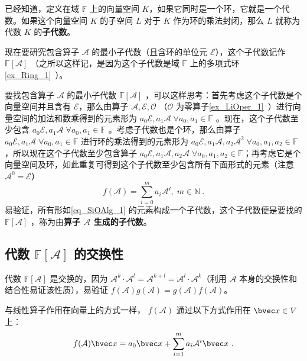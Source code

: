

已经知道，定义在域 $\mathbb{F}$ 上的向量空间 $K$，如果它同时是一个环，它就是一个代数。如果这个向量空间 $K$ 的子空间 $L$ 对于 $K$ 作为环的乘法封闭，那么 $L$ 就称为代数 $K$ 的\textbf{子代数}。

现在要研究包含算子 $\mathcal{A}$ 的最小子代数（且含环的单位元 $\mathcal{E}$），这个子代数记作 $\mathbb{F}[\mathcal A]$ （之所以这样记，是因为这个子代数是域 $\mathbb{F}$ 上的多项式环\autoref{ex_Ring_1}~）。

要找包含算子 $\mathcal{A}$ 的最小子代数 $\mathbb{F}[\mathcal A]$ ，可以这样思考：首先考虑这个子代数是个向量空间并且含有 $\mathcal{E}$，那么由算子 $\mathcal{A,E,O}$ （$\mathcal{O}$ 为零算子\autoref{ex_LiOper_1}~）进行向量空间的加法和数乘得到的元素形为 $a_0\mathcal{E},a_1\mathcal{A}\;\forall a_0,a_1\in\mathbb{F}$ 。现在，这个子代数至少包含 $a_0\mathcal{E},a_1\mathcal{A}\;\forall a_0,a_1\in\mathbb{F}$ 。考虑子代数也是个环，那么由算子 $a_0\mathcal{E},a_1\mathcal{A}\;\forall a_0,a_1\in\mathbb{F}$ 进行环的乘法得到的元素形为 $a_0\mathcal{E},a_1\mathcal{A},a_2\mathcal{A}^2\;\forall a_0,a_1,a_2\in\mathbb{F}$，所以现在这个子代数至少包含算子 $a_0\mathcal{E},a_1\mathcal{A},a_2\mathcal{A}\;\forall a_0,a_1,a_2\in\mathbb{F}$；再考虑它是个向量空间及环，如此重复可得到这个子代数至少包含所有下面形式的元素（注意 $\mathcal{A}^0=\mathcal{E}$）
\begin{equation}\label{eq_SiOAlg_1}
f(\mathcal{A})=\sum_{i=0}^ma_i\mathcal{A^i},\;m\in\mathbb{N}~.
\end{equation}
易验证，所有形如\autoref{eq_SiOAlg_1} 的元素构成一个子代数，这个子代数便是要找的 $\mathbb{F}[\mathcal A]$ ，称为由\textbf{算子 $\mathcal{A}$ 生成的子代数}。
\subsection{代数 $\mathbb{F}[\mathcal{A}]$ 的交换性}
代数 $\mathbb{F}[\mathcal A]$ 是交换的，因为 $\mathcal A^{k}\cdot \mathcal{A}^l=\mathcal{A}^{k+l}=\mathcal A^{l}\cdot \mathcal{A}^k$（利用 $\mathcal{A}$ 本身的交换性和结合性易证该性质），易验证 $f(\mathcal{A})g(\mathcal{A})=g(\mathcal{A})f(\mathcal{A})$。

与线性算子作用在向量上的方式一样， $f(\mathcal{A})$ 通过以下方式作用在 $\bvec x\in V$ 上：
\begin{equation}
f(\mathcal{A})\bvec x=a_0\bvec x+\sum_{i=1}^m a_i\mathcal{A}^i\bvec x~.
\end{equation}

